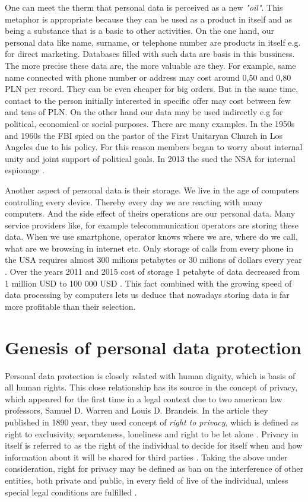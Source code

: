 \documentclass[en, noamssymb]{mgr}
\begin{document}
\indent One can meet the therm that personal data is perceived as a new \textit{"oil"}. This metaphor is appropriate because they can be used as a product in itself and as being a substance that is a basic to other activities. On the one hand, our personal data like name, surname, or telephone number are products in itself e.g. for direct marketing. Databases filled with such data are basis in this bussiness. The more precise these data are, the more valuable are they. For example, same name connected with phone number or address may cost around 0,50 and 0,80 PLN per record. They can be even cheaper for big orders. But in the same time, contact to the person initially interested in specific offer may cost between few and tens of PLN. On the other hand our data may be used indirectly e.g for political, economical or social purposes. There are many examples. In the 1950s and 1960s the FBI spied on the pastor of the First Unitaryan Church in Los Angeles due to his policy. For this reason members began to worry about internal unity and joint support of political goals. In 2013 the sued the NSA for internal espionage \cite{dane_i_goliat}.

\indent Another aspect of personal data is their storage. We live in the age of computers controlling every device. Thereby every day we are reacting with many computers. And the side effect of theirs operations are our personal data. Many service providers like, for example telecommunication operators are storing these data. When we use smartphone, operator knows where we are, where do we call, what are we browsing in internet etc. Only storage of calls from every phone in the USA requires almost 300 milions petabytes or 30 milions of dollars every year \cite{dane_i_goliat}. Over the years 2011 and 2015 cost of storage 1 petabyte of data decreased from 1 million USD to 100 000 USD \cite{dane_i_goliat}. This fact combined with the growing speed of data processing by computers lets us deduce that nowadays storing data is far more profitable than their selection.



\section{Genesis of personal data protection}

Personal data protection is closely related with human dignity, which is basis of all human rights. This close relationship has its source in the concept of privacy, which appeared for the first time in a legal context due to two american law professors, Samuel D. Warren and Louis D. Brandeis. In the article they published in 1890 year, they used concept of \textit{right to privacy}, which is defined as right to exclusivity, separateness, loneliness and right to be let alone \cite{geneza_odo}. Privacy in itself is referred to as the right of the individual to decide for itself when and how information about it will be shared for third parties \cite{geneza_odo}. Taking the above under consideration, right for privacy may be defined as ban on the interference of other entities, both private and public, in every field of live of the individual, unless special legal conditions are fulfilled \cite{geneza_odo}.
\end{document}

